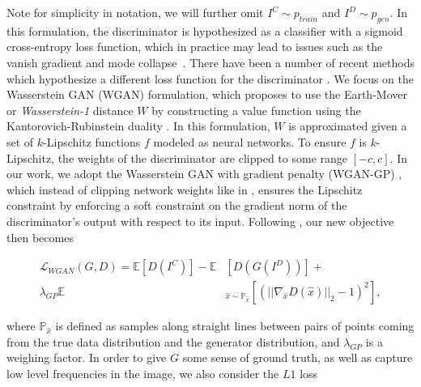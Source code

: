 Note for simplicity in notation, we will further omit $I^C \sim p_{train}$ and $I^D \sim p_{gen}$. In this formulation, 
the discriminator is hypothesized as a classifier with a sigmoid cross-entropy loss function, which in practice may lead to issues 
such as the vanish gradient and mode collapse~. There have been a number of recent methods which hypothesize a 
different loss function for the discriminator
\cite{mao2016least,arjovsky2017wasserstein,gulrajani2017improved,zhao2016energy}. We focus on the Wasserstein GAN
(WGAN) \cite{arjovsky2017wasserstein} formulation, which proposes to use the Earth-Mover or \textit{Wasserstein-1}
distance $W$ by constructing a value function using the Kantorovich-Rubinstein duality \cite{villani2008optimal}.
In this formulation, $W$ is approximated given a set of $k$-Lipschitz functions $f$ modeled as neural networks. To
ensure $f$ is $k$-Lipschitz, the weights of the discriminator are clipped to some range $[-c, c]$. In our work, we
adopt the Wasserstein GAN with gradient penalty (WGAN-GP) \cite{gulrajani2017improved}, which instead of clipping
network weights like in \cite{arjovsky2017wasserstein}, ensures the Lipschitz constraint by enforcing a soft
constraint on the gradient norm of the discriminator's output with respect to its input. Following
\cite{gulrajani2017improved}, our new objective then becomes

\begin{equation}
\begin{aligned}
   \mathcal{L}_{WGAN}(G,D) = \mathbb{E} [D(I^C)] - \mathbb{E} & [D(G(I^D))] + \\
   \lambda_{GP} \mathbb{E} & _{\hat{x} \sim \mathbb{P}_{\hat{x}}} [(|| \nabla_{\hat{x}} D(\hat{x})||_2 -1)^2 ],
\end{aligned}
\end{equation}


\noindent where $\mathbb{P}_{\hat{x}}$ is defined as samples along straight lines between pairs of points coming from
the true data distribution and the generator distribution, and $\lambda_{GP}$ is a weighing factor. In order to give $G$
some sense of ground truth, as well as capture low level frequencies in the image, we also consider the $L1$ loss

